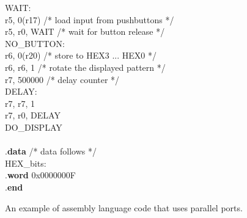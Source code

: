 \begin{figure}[h!]
\begin{center}
\begin{minipage}[t]{12.5 cm}
\begin{tabbing}
WAIT:\\
 \>r5, 0(r17) \>/* load input from pushbuttons */\\
 \>r5, r0, WAIT \>/* wait for button release */\\
NO\_BUTTON:\\
 \>r6, 0(r20) \>/* store to HEX3 ... HEX0 */\\
 \>r6, r6, 1 \>/* rotate the displayed pattern */\\
 \>r7, 500000 \>/* delay counter */\\
DELAY:	\\
 \>r7, r7, 1\\
 \>r7, r0, DELAY	\\
 \>DO\_DISPLAY\\
~\\
\>.{\bf data}	\>\>/* data follows */\\
HEX\_bits:\\
\>.{\bf word} \>0x0000000F\\
\>.{\bf end}\\
\end{tabbing}
\end{minipage}
\end{center}
	\vspace{-0.33in}\caption{An example of assembly language code that uses parallel ports.}
   \label{fig:getting_started_s}
\end{figure}
\pagebreak
\clearpage
\newpage

